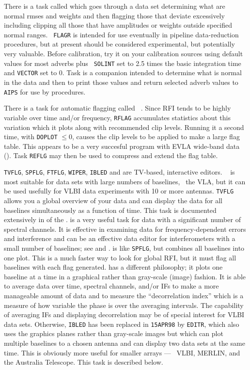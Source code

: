      There is a task called {\tt {}} which goes through a
data set determining what are normal rmses and weights and then
flagging those that deviate excessively including clipping all those
that have amplitudes or weights outside specified normal ranges.  {\tt
FLAGR} is intended for use eventually in pipeline data-reduction
procedures, but at present should be considered experimental, but
potentially very valuable.  Before calibration, try it on your
calibration sources using default values for most adverbs plus {\tt
SOLINT} set to 2.5 times the basic integration time and {\tt VECTOR}
set to 0.  Task {\tt {}} is a companion intended to
determine what is normal in the data and then to print those values
and return selected adverb values to {\tt AIPS} for use by procedures.

    There is a task for automatic flagging called {\tt
{}}\@.  Since RFI tends to be highly variable over time
and/or frequency, {\tt RFLAG} accumulates statistics about this
variation which it plots along with recommended clip levels.  Running
it a second time, with {\tt DOPLOT} $\leq 0$, causes the clip levels
to be applied to make a large flag table.  This appears to be a very
succesful program with EVLA wide-band data ().  Task
{\tt REFLG} may then be used to compress and extend the flag table.

    {\tt TVFLG}, {\tt SPFLG}, {\tt FTFLG}, {\tt WIPER}, {\tt IBLED}
and {\tt {}} are TV-based, interactive editors.  {\tt
{}} is most suitable for data sets with large numbers of
baselines, \eg\ the VLA, but it can be used usefully for VLBI data
experiments with 10 or more antennas.  {\tt TVFLG} allows you a global
overview of your data and can display the data for all baselines
simultaneously as a function of time.  This task is documented
extensively in  of the \Cookbook.  {\tt {}} is a
very useful task for data with a significant number of spectral
channels.  It is effective in examining data for frequency-dependent
errors and interference and can be an effective data editor for
interferometers with a small number of baselines; see  and
.  {\tt {}} is like {\tt SPFLG}, but combines
all baselines into one plot.  This is a much faster way to look for
global RFI, but it must flag all baselines with each flag generated.
{\tt {}}  has a different philosophy; it plots one baseline
at a time in a graphical rather than gray-scale (image) fashion.  It
is able to average data over time, spectral channels, and/or IFs to
make a more manageable amount of data and to measure the
``decorrelation index'' which is a measure of how variable the phase
is over the averaging intervals. The capability of averaging IFs and
displaying decorrelation may be of special interest for VLBI data
sets.  Otherwise, {\tt IBLED} has been replaced in {\tt 15APR98} by
{\tt EDITR}, which also uses the graphics planes rather than
gray-scale images but which can plot multiple baselines to a chosen
antenna and can display two data sets at the same time.  This is
obviously more useful for smaller arrays ---  \eg\ VLBI, MERLIN,  and
the Australia Telescope. This task is described below.

